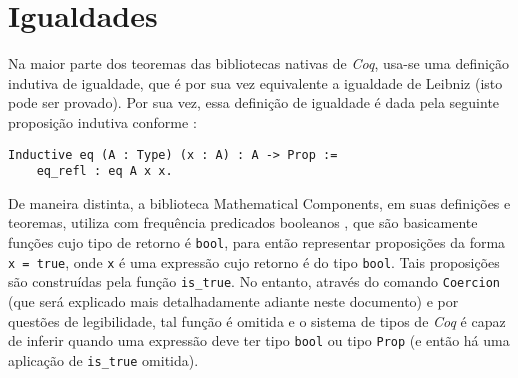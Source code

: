 \section{Igualdades}
Na maior parte dos teoremas das bibliotecas nativas de \textit{Coq}, usa-se uma definição indutiva de igualdade, que é por sua vez equivalente a igualdade de Leibniz (isto pode ser provado). Por sua vez, essa definição de igualdade é dada pela seguinte proposição indutiva conforme \cite{coqteam2022manual}:
\begin{lstlisting}[language=coq,frame=single,tabsize=1]
Inductive eq (A : Type) (x : A) : A -> Prop := 
    eq_refl : eq A x x.
\end{lstlisting}

De maneira distinta, a biblioteca Mathematical Components, em suas definições e teoremas, utiliza com frequência predicados booleanos \cite{assia_mahboubi_2022_7118596}, que são basicamente funções cujo tipo de retorno é \lstinline[language = coq]!bool!, para então representar proposições da forma \lstinline[language = coq]$x = true$, onde \lstinline[language = coq]$x$ é uma expressão cujo retorno é do tipo \lstinline[language = coq]!bool!. Tais proposições são construídas pela função \lstinline[language = coq]$is_true$. No entanto, através do comando \lstinline[language = coq]$Coercion$ (que será explicado mais detalhadamente adiante neste documento) e por questões de legibilidade, tal função é omitida e o sistema de tipos de \textit{Coq} é capaz de inferir quando uma expressão deve ter tipo \lstinline[language = coq]$bool$ ou tipo \lstinline[language = coq]$Prop$ (e então há uma aplicação de \lstinline[language = coq]$is_true$ omitida). 

